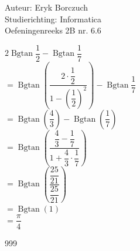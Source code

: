 \documentclass[a4paper]{article}
\begin{document}
  
\noindent \large Auteur: Eryk Borczuch \\
\noindent \large Studierichting: Informatica\\
\noindent \large Oefeningenreeks 2B nr. 6.6\\

\newcommand{\Bgtan}{\operatorname{Bgtan}}

\medskip

\normalsize

$2\Bgtan\dfrac{1}{2} - \Bgtan\dfrac{1}{7}$\\

$= \Bgtan\left(\dfrac{2\cdot\dfrac{1}{2}}{1-\left(\dfrac{1}{2}\right)^2}\right) - \Bgtan\dfrac{1}{7}$\\

$= \Bgtan \left(\dfrac{4}{3}\right) - \Bgtan \left(\dfrac{1}{7}\right)$\\

$=\Bgtan\left(\dfrac{\dfrac{4}{3}-\dfrac{1}{7}}{1+\dfrac{4}{3}\cdot \dfrac{1}{7}}\right)$\\

$=\Bgtan\left(\dfrac{\dfrac{25}{21}}{\dfrac{25}{21}}\right)$\\

$=\Bgtan(1)$\\

$= \dfrac{\pi}{4}$

\begin{thebibliography}{999}
\end{thebibliography}
\end{document}
